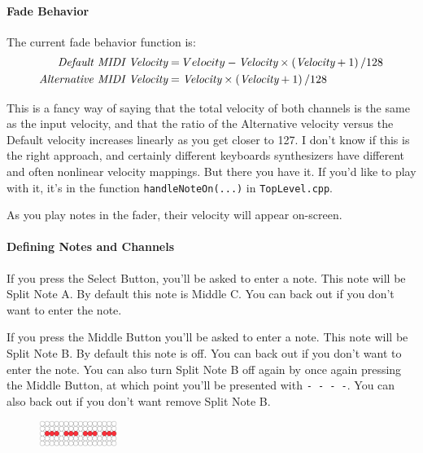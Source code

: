 \documentclass{article}
\begin{document}
\paragraph{Fade Behavior}  The current fade behavior function is:
\[
\begin{split}
\text{\it Default MIDI Velocity} &= Velocity - \text{\it Velocity} \times \left( \text{\it Velocity} + 1 \right) / 128\\
\text{\it Alternative MIDI Velocity} &= \text{\it Velocity} \times \left( \text{\it Velocity} + 1 \right) / 128
\end{split}
\]

This is a fancy way of saying that the total velocity of both channels is the same as the input velocity, and that the ratio of the Alternative velocity versus the Default velocity increases linearly as you get closer to 127.  I don't know if this is the right approach, and certainly different keyboards synthesizers have different and often nonlinear velocity mappings.  But there you have it.  If you'd like to play with it, it's in the function \texttt{handleNoteOn(...)} in \texttt{TopLevel.cpp}.

As you play notes in the fader, their velocity will appear on-screen.

\paragraph{Defining Notes and Channels}

If you press the Select Button, you'll be asked to enter a note.  This note will be Split Note A.  By default this note is Middle C.  You can back out if you don't want to enter the note.

If you press the Middle Button you'll be asked to enter a note.  This note will be Split Note B.  By default this note is off.  You can back out if you don't want to enter the note.  You can also turn Split Note B off again by once again pressing the Middle Button, at which point you'll be presented with \texttt{-~-~-~-}.  You can also back out if you don't want remove Split Note B.

\begin{figure}
\vspace{-1em}\includegraphics[width=1in]{none}
\vspace{-2em}
\end{figure}
\end{document}
